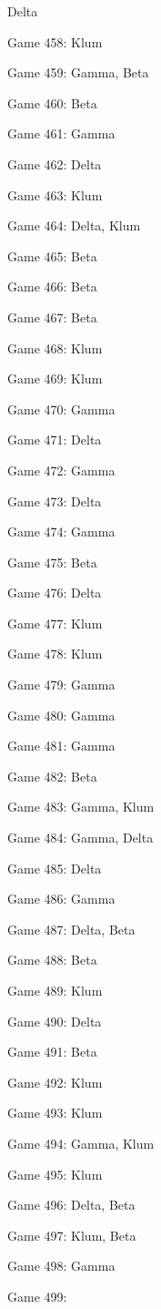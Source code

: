 \documentclass{article}
\begin{document}
\begin{multicols}{3}
\begin{compactitem}
Delta
\item Game 458:
Klum
\item Game 459:
Gamma, Beta
\item Game 460:
Beta
\item Game 461:
Gamma
\item Game 462:
Delta
\item Game 463:
Klum
\item Game 464:
Delta, Klum
\item Game 465:
Beta
\item Game 466:
Beta
\item Game 467:
Beta
\item Game 468:
Klum
\item Game 469:
Klum
\item Game 470:
Gamma
\item Game 471:
Delta
\item Game 472:
Gamma
\item Game 473:
Delta
\item Game 474:
Gamma
\item Game 475:
Beta
\item Game 476:
Delta
\item Game 477:
Klum
\item Game 478:
Klum
\item Game 479:
Gamma
\item Game 480:
Gamma
\item Game 481:
Gamma
\item Game 482:
Beta
\item Game 483:
Gamma, Klum
\item Game 484:
Gamma, Delta
\item Game 485:
Delta
\item Game 486:
Gamma
\item Game 487:
Delta, Beta
\item Game 488:
Beta
\item Game 489:
Klum
\item Game 490:
Delta
\item Game 491:
Beta
\item Game 492:
Klum
\item Game 493:
Klum
\item Game 494:
Gamma, Klum
\item Game 495:
Klum
\item Game 496:
Delta, Beta
\item Game 497:
Klum, Beta
\item Game 498:
Gamma
\item Game 499:

\end{compactitem}
\end{multicols}
\end{document}
